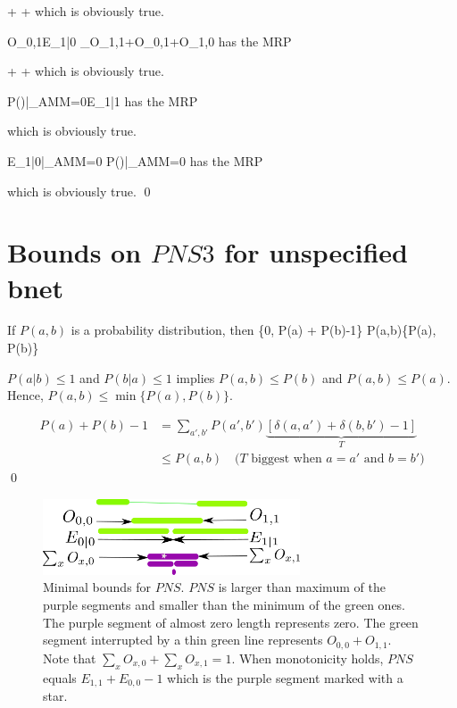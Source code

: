 \beq
{}
\leq
{}
\leq
{}
+
+
\eeq
which is obviously true.

\beq
O_{0,1}\leq E_{1|0} \leq
{}
_{O_{1,1}+O_{0,1}+O_{1,0}}
\eeq
has the MRP

\beq
{}
\leq
{}
\leq
{}
+
+
\eeq
which is obviously true.

\beq
P()|_{AMM=0}\leq E_{1|1}
\eeq
has the MRP

\beq
{}
\leq
{}
\eeq
which is obviously true.

\beq
E_{1|0}|_{AMM=0}\leq
P()|_{AMM=0}
\eeq
has the MRP

\beq
{}
\leq
{}
\eeq
which is obviously true.
\qed



\section{Bounds on $PNS3$ for unspecified bnet}

\begin{claim}\label{cl-basic-bound-joint}
If $P(a,b)$ is a probability
distribution, then
\beq
\max\{0, P(a) + P(b)-1\}\leq
P(a,b)\leq \min\{P(a), P(b)\}
\eeq
\end{claim}
\proof
$P(a|b)\leq 1$
and $P(b|a)\leq 1$
implies $P(a,b)\leq P(b)$
and $P(a,b)\leq P(a)$.
Hence, $P(a,b)\leq \min\{P(a), P(b)\}$.

\begin{align}
P(a) + P(b) -1
&=
\sum_{a', b'} P(a',b')
\underbrace
{[\delta(a,a')+\delta(b,b')
-1]}_{T}
\\
&\leq
P(a,b)\quad
\text{($T$ biggest
when $a=a'$ and $b=b'$)}
\end{align}
\qed


\begin{figure}[h!]
\centering
\includegraphics[width=3in]
{personalized/bounds-minimal.png}
\caption{Minimal bounds
for $PNS$.
$PNS$ is larger
than maximum of the purple segments
and smaller than the
minimum of the green ones.
The purple segment of almost zero
length represents zero.
The green segment
interrupted by a thin green
line represents $O_{0,0} + O_{1,1}$.
Note that $\sum_x O_{x,0}+
\sum_x O_{x,1}=1$. When
monotonicity holds,
$PNS$ equals $E_{1,1}+E_{0,0}-1$
which is the purple
segment marked with a star.
}
\label{fig-bounds-minimal}
\end{figure}

